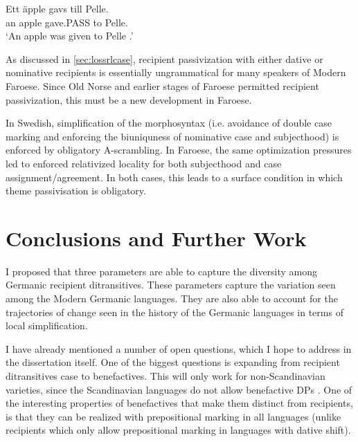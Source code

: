 \begin{exe}
\ex 
\begin{xlist}
\ex \gll Ett äpple gavs till Pelle.\\
 an apple gave.PASS to Pelle.\\
\trans `An apple was given to Pelle \citep{Anward.1989,Lundquist.2006}.'
\end{xlist}
\end{exe}

As discussed in \autoref{sec:lossrlcase}, recipient passivization with either dative or nominative recipients is essentially ungrammatical for many speakers of Modern Faroese. Since Old Norse and earlier stages of Faroese permitted recipient passivization, this must be a new development in Faroese. 

In Swedish, simplification of the morphosyntax (i.e. avoidance of double case marking and enforcing the biuniquness of nominative case and subjecthood) is enforced by obligatory A-scrambling. In Faroese, the same optimization pressures led to enforced relativized locality for both subjecthood and case assignment/agreement. In both cases, this leads to a surface condition in which theme passivisation is obligatory.

\section{Conclusions and Further Work}
I proposed that three parameters are able to capture the diversity among Germanic recipient ditransitives. These parameters capture the variation seen among the Modern Germanic languages. They are also able to account for the trajectories of change seen in the history of the Germanic languages in terms of local simplification.

I have already mentioned a number of open questions, which I hope to address in the dissertation itself. One of the biggest questions is expanding from recipient ditransitives case to benefactives. This will only work for non-Scandinavian varieties, since the Scandinavian languages do not allow benefactive DPs \citep{Lundquist.2013b}. One of the interesting properties of benefactives that make them distinct from recipients, is that they can be realized with prepositional marking in all languages (unlike recipients which only allow prepositional marking in languages with dative shift). 

